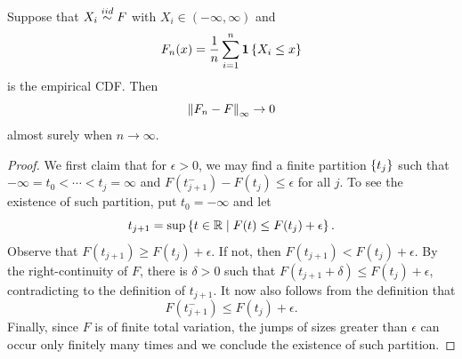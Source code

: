\begin{theorem}
    Suppose that $X_i\overset{iid}{\sim} F$ with $X_i\in(-\infty, \infty)$ and 
    \begin{equation*}
        F_n(x) = \frac{1}{n}\sum_{i=1}^n\mathbf{1}\left\{ {X_i\leq x} \right\}
    \end{equation*}
    is the empirical CDF. Then 
    \begin{equation*}
        \left\lVert {F_n - F} \right\rVert_{\infty} \to 0
    \end{equation*}
    almost surely when $n\to\infty$. 
\end{theorem}
\begin{proof}
    We first claim that for $\epsilon>0$, we may find a finite partition 
    $\left\{ {t_j} \right\}$ such that $-\infty = t_0 <\cdots<t_j = \infty$ and 
    $F(t_{j+1}^-) - F(t_j) \leq \epsilon$ for all $j$. To see the existence of 
    such partition, put $t_0 = -\infty$ and let 
    \begin{equation*}
        t_{j+1} = \sup\left\{ t\in\mathbb{R} \;\middle\vert\; F(t)\leq F(t_j)+\epsilon \right\}. 
    \end{equation*}
    Observe that $F(t_{j+1})\geq F(t_j) + \epsilon$. If not, 
    then $F(t_{j+1}) < F(t_j) + \epsilon$. By the right-continuity 
    of $F$, there is $\delta > 0$ such that $F(t_{j+1} + \delta)\leq F(t_j) + \epsilon$, 
    contradicting to the definition of $t_{j+1}$. It now also 
    follows from the definition that 
    \begin{equation*}
        F(t_{j+1}^-) \leq F(t_j) + \epsilon. 
    \end{equation*}
    Finally, since $F$ is of finite total variation, the 
    jumps of sizes greater than $\epsilon$ can occur only 
    finitely many times and we conclude the existence of such 
    partition. 


\end{proof}
